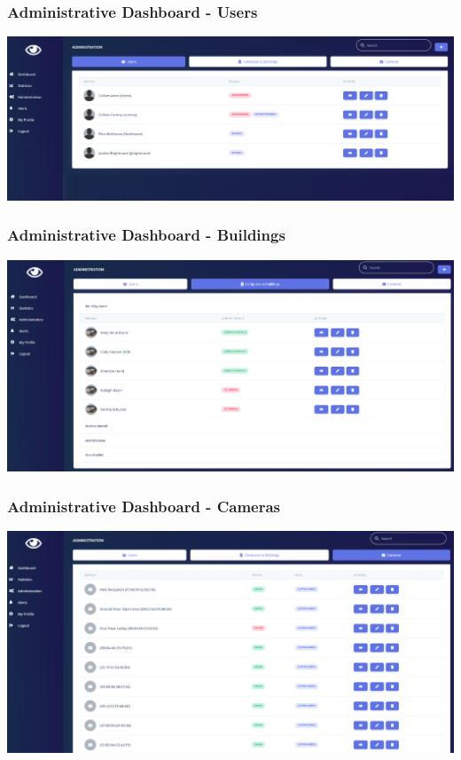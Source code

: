 \documentclass[
  english,
  a4paper,
,tablecaptionabove
]{scrartcl}
\begin{document}
\hypertarget{administrative-dashboard---users}{%
\subsubsection{Administrative Dashboard -
Users}\label{administrative-dashboard---users}}

\includegraphics{images/ppm-images/dashboard-users.png} \newpage

\hypertarget{administrative-dashboard---buildings}{%
\subsubsection{Administrative Dashboard -
Buildings}\label{administrative-dashboard---buildings}}

\includegraphics{images/ppm-images/dashboard-buildings.png} \newpage

\hypertarget{administrative-dashboard---cameras}{%
\subsubsection{Administrative Dashboard -
Cameras}\label{administrative-dashboard---cameras}}

\includegraphics{images/ppm-images/dashboard-camera.png} \newpage
\end{document}
